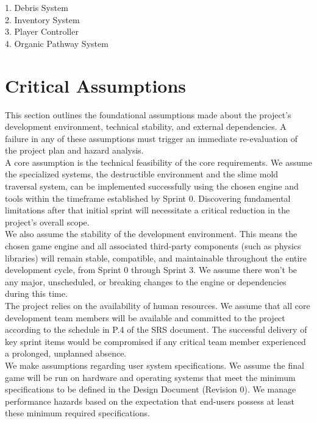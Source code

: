\documentclass{article}
\begin{document}
1. Debris System\\
2. Inventory System\\
3. Player Controller\\
4. Organic Pathway System\\

\section{Critical Assumptions}

This section outlines the foundational assumptions made about the project's development environment, technical stability, and external dependencies. A failure in any of these assumptions must trigger an immediate re-evaluation of the project plan and hazard analysis.\\

A core assumption is the technical feasibility of the core requirements. We assume the specialized systems, the destructible environment and the slime mold traversal system, can be implemented successfully using the chosen engine and tools within the timeframe established by Sprint 0. Discovering fundamental limitations after that initial sprint will necessitate a critical reduction in the project's overall scope.\\

We also assume the stability of the development environment. This means the chosen game engine and all associated third-party components (such as physics libraries) will remain stable, compatible, and maintainable throughout the entire development cycle, from Sprint 0 through Sprint 3. We assume there won't be any major, unscheduled, or breaking changes to the engine or dependencies during this time.\\

The project relies on the availability of human resources. We assume that all core development team members will be available and committed to the project according to the schedule in P.4 of the SRS document. The successful delivery of key sprint items would be compromised if any critical team member experienced a prolonged, unplanned absence.\\

We make assumptions regarding user system specifications. We assume the final game will be run on hardware and operating systems that meet the minimum specifications to be defined in the Design Document (Revision 0). We manage performance hazards based on the expectation that end-users possess at least these minimum required specifications.\\
\end{document}
